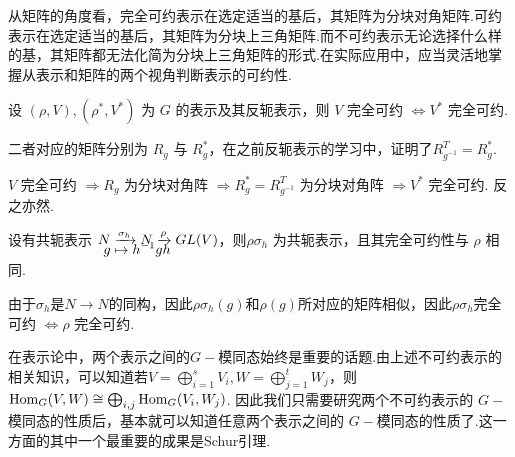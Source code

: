 从矩阵的角度看，完全可约表示在选定适当的基后，其矩阵为分块对角矩阵.可约表示在选定适当的基后，其矩阵为分块上三角矩阵.而不可约表示无论选择什么样的基，其矩阵都无法化简为分块上三角矩阵的形式.在实际应用中，应当灵活地掌握从表示和矩阵的两个视角判断表示的可约性.

\begin{instance}
    设 $(\rho, V), (\rho^*, V^*)$ 为 $G$ 的表示及其反轭表示，则 $V$ 完全可约 $\iff V^*$ 完全可约.\par
    二者对应的矩阵分别为 $R_g$ 与 $R_g^*$，在之前反轭表示的学习中，证明了$R_{g^{-1}}^T = R_g^*$.\par
    $V$ 完全可约 $\Rightarrow R_g$ 为分块对角阵 $\Rightarrow R_g^* = R_{g^{-1}}^T$ 为分块对角阵 $\Rightarrow V^*$ 完全可约. 反之亦然.
\end{instance}

\begin{instance}
    设有共轭表示 $\setjot[-6]\begin{aligned}[t]
        N &\xrightarrow{\sigma_h} N \xrightarrow{\rho} GL(V) \\
        g &\mapsto h^{-1}gh
    \end{aligned}$，则$\rho\sigma_h$ 为共轭表示，且其完全可约性与 $\rho$ 相同. \par
    由于$\sigma_h$是$N\to N$的同构，因此$\rho\sigma_h(g)$和$\rho(g)$所对应的矩阵相似，因此$\rho\sigma_h$完全可约 $\iff \rho$ 完全可约.
\end{instance}

在表示论中，两个表示之间的$G-\!\!$模同态始终是重要的话题.由上述不可约表示的相关知识，可以知道若$V = \bigoplus_{i=1}^s V_i, W = \bigoplus_{j=1}^t W_j$，则 $\operatorname{Hom}_G(V, W) \cong \bigoplus_{i,j} \operatorname{Hom}_G(V_i, W_j)$. 因此我们只需要研究两个不可约表示的 $G-\!\!$模同态的性质后，基本就可以知道任意两个表示之间的 $G-\!\!$模同态的性质了.这一方面的其中一个最重要的成果是Schur引理.

